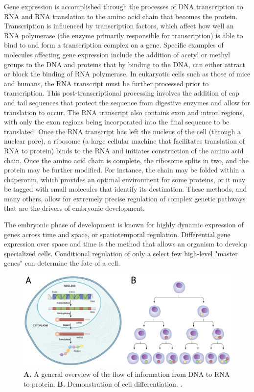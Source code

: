 \documentclass[12pt,oneside,onecolumn,a4paper]{article}
\begin{document}
Gene expression is accomplished through the processes of DNA transcription to RNA and RNA translation to the amino acid chain that becomes the protein. Transcription is influenced by transcription factors, which affect how well an RNA polymerase (the enzyme primarily responsible for transcription) is able to bind to and form a transcription complex on a gene. Specific examples of molecules affecting gene expression include the addition of acetyl or methyl groups to the DNA and proteins that by binding to the DNA, can either attract or block the binding of RNA polymerase. In eukaryotic cells such as those of mice and humans, the RNA transcript must be further processed prior to transcription. This post-transcriptional processing involves the addition of cap and tail sequences that protect the sequence from digestive enzymes and allow for translation to occur. The RNA transcript also contains exon and intron regions, with only the exon regions being incorporated into the final sequence to be translated. Once the RNA transcript has left the nucleus of the cell (through a nuclear pore), a ribosome (a large cellular machine that facilitates translation of RNA to protein) binds to the RNA and initiates construction of the amino acid chain. Once the amino acid chain is complete, the ribosome splits in two, and the protein may be further modified. For instance, the chain may be folded within a chaperonin, which provides an optimal environment for some proteins, or it may be tagged with small molecules that identify its destination. These methods, and many others, allow for extremely precise regulation of complex genetic pathways that are the drivers of embryonic development.

The embryonic phase of development is known for highly dynamic expression of genes across time and space, or spatiotemporal regulation. Differential gene expression over space and time is the method that allows an organism to develop specialized cells. Conditional regulation of only a  select few high-level "master genes" can determine the fate of a cell. 
\citep{bisceglia_2010}

\begin{figure}[h!]
\begin{center}
\includegraphics[width=0.8\columnwidth]{figures/Untitled/Untitled}
\caption{\textbf{A.} A general overview of the flow of information from DNA to RNA to protein. \textbf{B.} Demonstration of cell differentiation. \citep{bisceglia_2010}.%
}
\end{center}
\end{figure}
\end{document}
